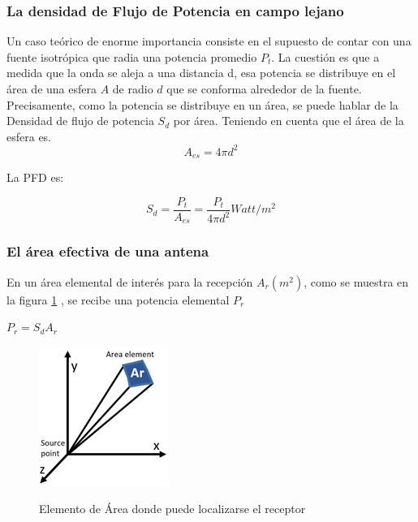 \subsubsection{La densidad de Flujo de Potencia en campo lejano}

Un caso teórico de enorme importancia consiste en el supuesto de contar con una fuente isotrópica que radia una potencia promedio $P_t$. La cuestión es que a medida que la onda se aleja a una distancia d, esa potencia se distribuye en el área de una  esfera $A$ de radio $d$ que se conforma alrededor de la fuente. Precisamente, como la potencia se distribuye en un área, se puede hablar de la Densidad de flujo de potencia $S_d$ por área.  Teniendo en cuenta que el área de la esfera es.\\

\begin{equation} \label{equ_cuarenta_ocho}
	 A_{es}= 4 \pi d^{2}
\end{equation}

La PFD es:

\begin{equation} \label{equ_cuarenta_nueve}
	S_{d}= \dfrac{P_t}{A_{es}}= \dfrac{P_t}{4 \pi d^{2}} Watt/m^{2}
\end{equation}

\subsubsection{El área efectiva de una antena }

En un área elemental de interés para la recepción $A_r (m^{2})$, como se muestra en la figura \ref{fig:Antena} , se recibe una potencia elemental $P_r$

$P_r= S_d A_r$

\begin{figure}[h!]
	\captionsetup{justification = raggedright, singlelinecheck = false}
	\caption{Elemento de Área donde puede localizarse el receptor} 
	\centering
	\includegraphics[scale=1.1]{Imagenes/Antena.png}
	\label{fig:Antena}
\end{figure}


